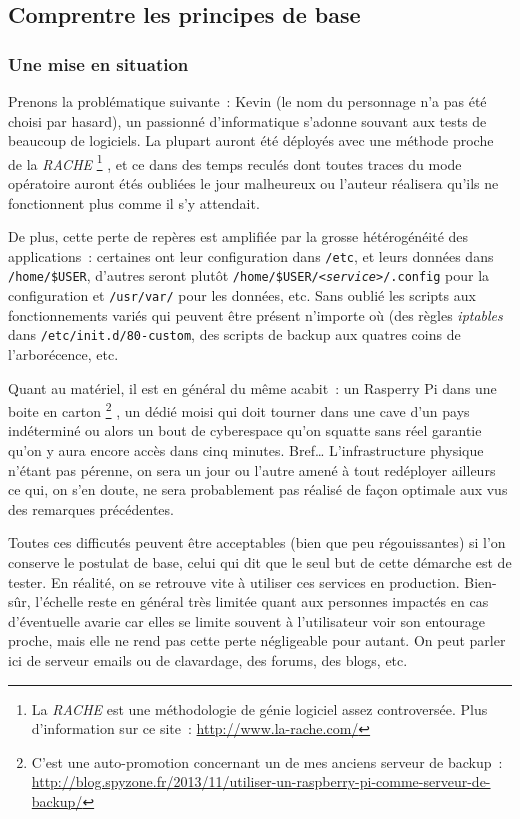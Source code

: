 \subsection{Comprentre les principes de base}
\subsubsection{Une mise en situation}

Prenons la problématique suivante~:
Kevin (le nom du personnage n'a pas été choisi par hasard), un passionné d'informatique s'adonne souvant aux tests de beaucoup de logiciels.
La plupart auront été déployés avec une méthode proche de la \emph{RACHE}%
\footnote{La \emph{RACHE} est une méthodologie de génie logiciel assez controversée. Plus d'information sur ce site~: \url{http://www.la-rache.com/}}%
, et ce dans des temps reculés dont toutes traces du mode opératoire auront étés oubliées le jour malheureux ou l'auteur réalisera qu'ils ne fonctionnent plus comme il s'y attendait.

De plus, cette perte de repères est amplifiée par la grosse hétérogénéité des applications~: certaines ont leur configuration dans {\tt/etc}, et leurs données dans {\tt/home/\$USER}, d'autres seront plutôt {\tt/home/\$USER/\emph{<service>}/.config} pour la configuration et {\tt/usr/var/} pour les données, etc.
Sans oublié les scripts aux fonctionnements variés qui peuvent être présent n'importe où (des règles \emph{iptables} dans {\tt/etc/init.d/80-custom}, des scripts de backup aux quatres coins de l'arborécence, etc.

Quant au matériel, il est en général du même acabit~: un Rasperry Pi dans une boite en carton%
\footnote{C'est une auto-promotion concernant un de mes anciens serveur de backup~: \url{http://blog.spyzone.fr/2013/11/utiliser-un-raspberry-pi-comme-serveur-de-backup/}}%
, un dédié moisi qui doit tourner dans une cave d'un pays indéterminé ou alors un bout de cyberespace qu'on squatte sans réel garantie qu'on y aura encore accès dans cinq minutes.
Bref\dots{} L'infrastructure physique n'étant pas pérenne, on sera un jour ou l'autre amené à tout redéployer ailleurs ce qui, on s'en doute, ne sera probablement pas réalisé de façon optimale aux vus des remarques précédentes.

Toutes ces difficutés peuvent être acceptables (bien que peu régouissantes) si l'on conserve le postulat de base, celui qui dit que le seul but de cette démarche est de tester.
En réalité, on se retrouve vite à utiliser ces services en production.
Bien-sûr, l'échelle reste en général très limitée quant aux personnes impactés en cas d'éventuelle avarie car elles se limite souvent à l'utilisateur voir son entourage proche, mais elle ne rend pas cette perte négligeable pour autant.
On peut parler ici de serveur emails ou de clavardage, des forums, des blogs, etc.

